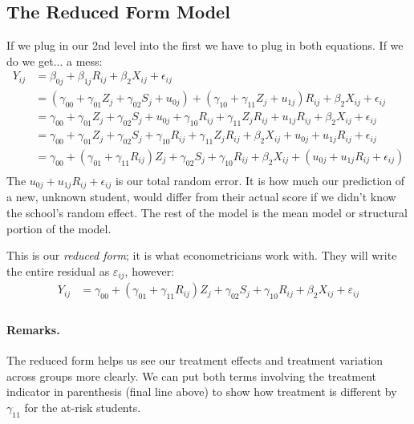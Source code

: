 \documentclass[
  letterpaper,
  DIV=11,
  numbers=noendperiod]{scrreprt}
\let\oldparagraph\paragraph
\renewcommand{\paragraph}[1]{\oldparagraph{#1}\mbox{}}
\begin{document}
\hypertarget{the-reduced-form-model-1}{%
\subsection{The Reduced Form Model}\label{the-reduced-form-model-1}}

If we plug in our 2nd level into the first we have to plug in both
equations. If we do we get... a mess: \[\begin{aligned}
Y_{ij} &= \beta_{0j} + \beta_{1j} R_{ij} + \beta_{2} X_{ij} + \epsilon_{ij} \\
&= (\gamma_{00} + \gamma_{01} Z_{j} + \gamma_{02} S_{j} + u_{0j}) + (\gamma_{10} + \gamma_{11} Z_{j} + u_{1j}) R_{ij} + \beta_{2} X_{ij} + \epsilon_{ij} \\
&= \gamma_{00} + \gamma_{01} Z_{j} + \gamma_{02} S_{j} + u_{0j} + \gamma_{10} R_{ij} + \gamma_{11} Z_{j} R_{ij} + u_{1j} R_{ij} + \beta_{2} X_{ij} + \epsilon_{ij} \\ 
&= \gamma_{00} + \gamma_{01} Z_{j} + \gamma_{02} S_{j} + \gamma_{10} R_{ij} + \gamma_{11} Z_{j} R_{ij} + \beta_{2} X_{ij} + u_{0j} +  u_{1j} R_{ij} + \epsilon_{ij} \\
&= \gamma_{00} + (\gamma_{01} + \gamma_{11} R_{ij} ) Z_{j}  + \gamma_{02} S_{j} + \gamma_{10} R_{ij} + \beta_{2} X_{ij} + (u_{0j} +  u_{1j} R_{ij} + \epsilon_{ij}) \\
\end{aligned}\] The \(u_{0j} + u_{1j} R_{ij} + \epsilon_{ij}\) is our
total random error. It is how much our prediction of a new, unknown
student, would differ from their actual score if we didn't know the
school's random effect. The rest of the model is the mean model or
structural portion of the model.

This is our \emph{reduced form}; it is what econometricians work with.
They will write the entire residual as \(\varepsilon_{ij}\), however:
\[\begin{aligned}
Y_{ij} &= \gamma_{00} + (\gamma_{01} + \gamma_{11} R_{ij} ) Z_{j}  + \gamma_{02} S_{j} + \gamma_{10} R_{ij} + \beta_{2} X_{ij} + \varepsilon_{ij} \\
\end{aligned}\]

\hypertarget{remarks.-3}{%
\paragraph{Remarks.}\label{remarks.-3}}

The reduced form helps us see our treatment effects and treatment
variation across groups more clearly. We can put both terms involving
the treatment indicator in parenthesis (final line above) to show how
treatment is different by \(\gamma_{11}\) for the at-risk students.
\end{document}
